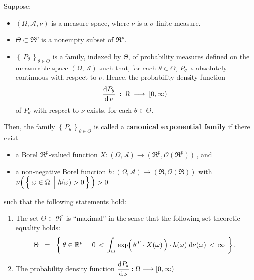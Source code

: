 \begin{definition}
\mbox{}\vskip 0.1cm
\noindent
Suppose:
\begin{itemize}
\item
	$(\Omega,\mathcal{A},\nu)$ is a measure space, where $\nu$ is a $\sigma$-finite measure.
\item
	$\Theta \subset \Re^{p}$ is a nonempty subset of $\Re^{p}$.
\item
	$\left\{\,P_{\theta}\,\right\}_{\theta \in \Theta}$ is a family, indexed by $\Theta$,
	of probability measures defined on the measurable space $(\Omega,\mathcal{A})$ such that,
	for each $\theta \in \Theta$, $P_{\theta}$ is absolutely continuous with respect to $\nu$.
	Hence, the probability density function
	\begin{equation*}
	\dfrac{\textnormal{d} P_{\theta}}{\textnormal{d}\,\nu} \; : \; \Omega \; \longrightarrow \; [0,\infty)
	\end{equation*}
	of $P_{\theta}$ with respect to $\nu$ exists, for each $\theta \in \Theta$.
\end{itemize}
Then, the family $\left\{\,P_{\theta}\,\right\}_{\theta \in \Theta}$ is called a
\textbf{{\color{red}canonical} exponential family}
if there exist
\begin{itemize}
\item
	a Borel $\Re^{p}$-valued function $X : (\Omega,\mathcal{A}) \longrightarrow (\Re^{p},\mathcal{O}(\Re^{p}))$\,, and
\item
	a non-negative Borel function $h : (\Omega,\mathcal{A}) \longrightarrow (\Re,\mathcal{O}(\Re))$ with
	\,$\nu\!\left(\,\left\{\,\left.\omega\overset{{\color{white}.}}{\in}\Omega\,\;\right\vert\,h(\omega) > 0\,\right\}\,\right) > 0$
\end{itemize}
such that the following statements hold:
\begin{enumerate}
\item
	The set $\Theta \subset \Re^{p}$ is ``maximal''
	in the sense that the following set-theoretic equality holds:
	\begin{equation*}
	\Theta
	\;\; = \;\;
		\left\{\;
			\theta \in \Re^{p}
			\;\left\vert\;\;
			0 \, < \,
			\int_{\Omega}\,
				\exp\!\left(\,\theta^{T} \!\overset{{\color{white}-}}{\cdot}\! X(\omega)\,\right) \cdot h(\omega)
			\;\d\nu(\omega)
			\, < \, \infty
			\right.
		\;\right\}.
	\end{equation*}	
\item
	The probability density function
	$\dfrac{\textnormal{d} P_{\theta}}{\textnormal{d}\,\nu} : \Omega \longrightarrow [0,\infty)$

\end{enumerate}
\end{definition}
